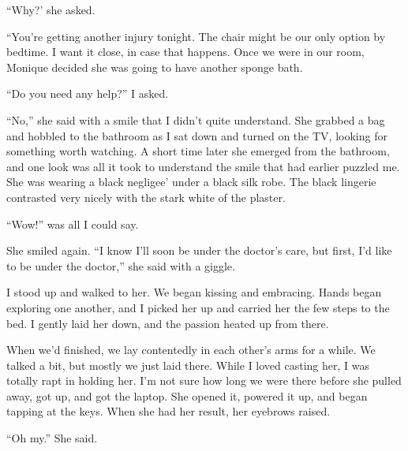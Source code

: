 ``Why?' she asked.

``You're getting another injury tonight. The chair might be our only option by bedtime. I
want it close, in case that happens. Once we were in our room, Monique decided she was going to
have another sponge bath.

``Do you need any help?'' I asked.

``No,'' she said with a smile that I didn't quite understand. She grabbed a bag and hobbled
to the bathroom as I sat down and turned on the TV, looking for something worth watching. A
short time later she emerged from the bathroom, and one look was all it took to understand the
smile that had earlier puzzled me. She was wearing a black negligee' under a black silk robe.
The black lingerie contrasted very nicely with the stark white of the plaster.

``Wow!'' was all I could say.

She smiled again. ``I know I'll soon be under the doctor's care, but first, I'd like to be
under the doctor,'' she said with a giggle.

I stood up and walked to her. We began kissing and embracing. Hands began exploring one
another, and I picked her up and carried her the few steps to the bed. I gently laid her down,
and the passion heated up from there.

When we'd finished, we lay contentedly in each other's arms for a while. We talked a bit,
but mostly we just laid there. While I loved casting her, I was totally rapt in holding her. I'm
not sure how long we were there before she pulled away, got up, and got the laptop. She opened
it, powered it up, and began tapping at the keys. When she had her result, her eyebrows raised.

``Oh my.'' She said.

